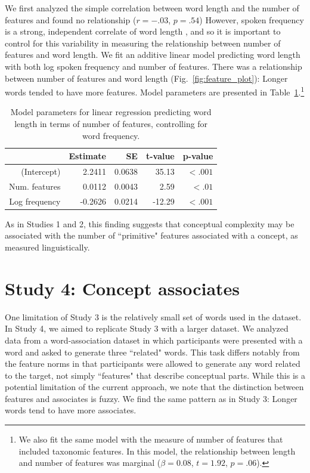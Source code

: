 We first analyzed the simple correlation between word length and the number of features and found no relationship ($r=-.03$, $p=.54$)  However, spoken frequency is a strong, independent correlate of word length \cite{zipf1936}, and so it is important to control for this variability in measuring the relationship between number of features and word length. We fit an additive linear model predicting word length with both log spoken frequency and number of features.  There was a  relationship between number of features and word length (Fig.\ \ref{fig:feature_plot}): Longer words tended to have more features. Model parameters are presented in Table~\ref{study3amodel}.\footnote{We also fit the same model with the measure of number of features that included taxonomic features. In this model, the relationship between length and number of features was marginal ($\beta=0.08$, $t =1.92$, $p=.06$).} 



\begin{table}[t!]
\centering
\begin{tabular}{rrrrr}
  \hline
 & Estimate & SE & t-value & p-value \\ 
  \hline
(Intercept) & 2.2411 & 0.0638 & 35.13 & $<.001$ \\ 
  Num. features & 0.0112 & 0.0043 & 2.59 & $<.01$\\ 
  Log frequency & -0.2626 & 0.0214 & -12.29 & $<.001$  \\ 
   \hline
\end{tabular}
\caption{Model parameters for linear regression predicting word length in terms of number of features, controlling for word frequency.}
\label{study3amodel}
\end{table}

As in Studies 1 and 2, this finding suggests that conceptual complexity may be associated with the number of ``primitive" features associated with a concept, as measured linguistically.

\section{Study 4: Concept associates}
One limitation of Study 3 is the relatively small set of words used in the dataset. In Study 4, we aimed to replicate Study 3 with a larger dataset. We analyzed data from a word-association dataset in which participants were presented with a word and asked to generate three ``related" words. This task differs notably from the feature norms in that participants were allowed to generate any word related to the target, not simply ``features" that describe conceptual parts. While this is a potential limitation of the current approach, we note that the distinction between features and associates is fuzzy. We find  the same pattern as in Study 3: Longer words tend to have more associates. 

